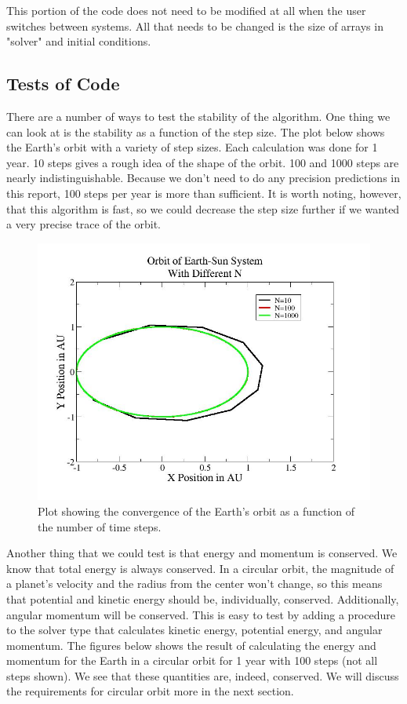 \documentclass[%
oneside,                 %
final,                   %
10pt]{article}
\begin{document}
This portion of the code does not need to be modified at all when the user switches between systems.  All that needs to be changed is the size of arrays in "solver" and  initial conditions.

\subsection{Tests of Code}

There are a number of ways to test the stability of the algorithm.  One thing we can look at is the stability as a function of the step size.  The plot below shows the Earth's orbit with a variety of step sizes.  Each calculation was done for 1 year.  10 steps gives a rough idea of the shape of the orbit.  100 and 1000 steps are nearly indistinguishable.  Because we don't need to do any precision predictions in this report, 100 steps per year is more than sufficient.  It is worth noting, however, that this algorithm is fast, so we could decrease the step size further if we wanted a very precise trace of the orbit.

\begin{figure}[H]\label{fig:velrplot}
  \centering
    \includegraphics[width=1.0\textwidth]{num.jpg}
    \caption{Plot showing the convergence of the Earth's orbit as a function of the number of time steps.}
\end{figure}

Another thing that we could test is that energy and momentum is conserved.  We know that total energy is always conserved.  In a circular orbit, the magnitude of a planet's velocity and the radius from the center won't change, so this means that potential and kinetic energy should be, individually, conserved.  Additionally, angular momentum will be conserved.  This is easy to test by adding a procedure to the solver type that calculates kinetic energy, potential energy, and angular momentum.  The figures below shows the result of calculating the energy and momentum for the Earth in a circular orbit for 1 year with 100 steps (not all steps shown).  We see that these quantities are, indeed, conserved.  We will discuss the requirements for circular orbit more in the next section.
\end{document}
